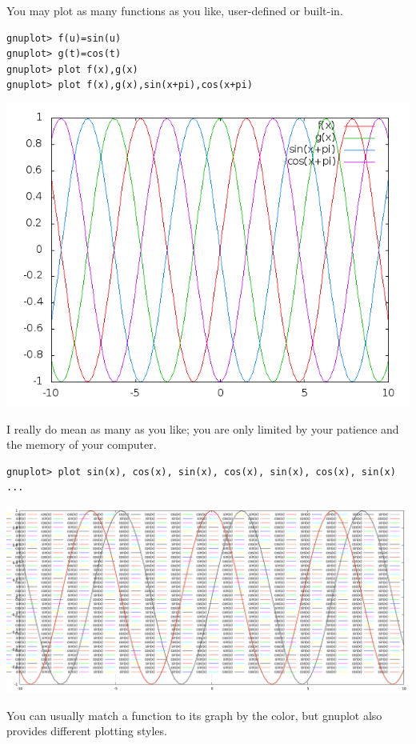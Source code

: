 \documentclass[11pt,letterpaper]{report}
\begin{document}
You may plot as many functions as you like, user-defined or built-in.
\begin{verbatim}
gnuplot> f(u)=sin(u)
gnuplot> g(t)=cos(t)
gnuplot> plot f(x),g(x)
gnuplot> plot f(x),g(x),sin(x+pi),cos(x+pi)
\end{verbatim}
\includegraphics[width=150mm]{multi-plots.png}

I really do mean as many as you like; you are only limited by your patience and the memory of your computer.

\begin{verbatim}
gnuplot> plot sin(x), cos(x), sin(x), cos(x), sin(x), cos(x), sin(x) ...
\end{verbatim}

\includegraphics[width=150mm]{too-many-plots.png}


You can usually match a function to its graph by the color, but gnuplot also provides different plotting styles.
\end{document}
